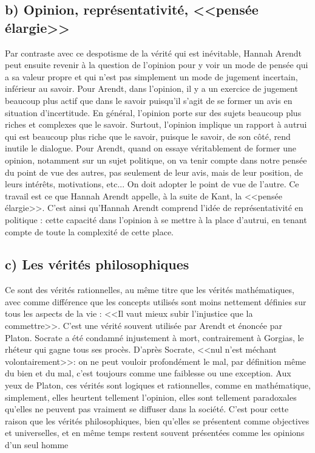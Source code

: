 \documentclass[12pt]{article}
\begin{document}
\subsection*{b) Opinion, représentativité, <<pensée élargie>>}
Par contraste avec ce despotisme de la vérité qui est inévitable, Hannah Arendt peut ensuite revenir à la question de l'opinion pour y voir un mode de pensée qui a sa valeur propre et qui n'est pas simplement un mode de jugement incertain, inférieur au savoir.
Pour Arendt, dans l'opinion, il y a un exercice de jugement beaucoup plus actif que dans le savoir puisqu'il s'agit de se former un avis en situation d'incertitude.
En général, l'opinion porte sur des sujets beaucoup plus riches et complexes que le savoir.
Surtout, l'opinion implique un rapport à autrui qui est beaucoup plus riche que le savoir, puisque le savoir, de son côté, rend inutile le dialogue.
Pour Arendt, quand on essaye véritablement de former une opinion, notamment sur un sujet politique, on va tenir compte dans notre pensée du point de vue des autres, pas seulement de leur avis, mais de leur position, de leurs intérêts, motivations, etc... On doit adopter le point de vue de l'autre.
Ce travail est ce que Hannah Arendt appelle, à la suite de Kant, la <<pensée élargie>>.
C'est ainsi qu'Hannah Arendt comprend l'idée de représentativité en politique : cette capacité dans l'opinion à se mettre à la place d'autrui, en tenant compte de toute la complexité de cette place. 
\pagebreak
\subsection*{c) Les vérités philosophiques}
Ce sont des vérités rationnelles, au même titre que les vérités mathématiques, avec comme différence que les concepts utilisés sont moins nettement définies sur tous les aspects de la vie : <<Il vaut mieux subir l'injustice que la commettre>>.
C'est une vérité souvent utilisée par Arendt et énoncée par Platon. Socrate a été condamné injustement à mort, contrairement à Gorgias, le rhéteur qui gagne tous ses procès. D'après Socrate, <<nul n'est méchant volontairement>>: on ne peut vouloir profondément le mal, par définition même du bien et du mal, c'est toujours comme une faiblesse ou une exception.
Aux yeux de Platon, ces vérités sont logiques et rationnelles, comme en mathématique, simplement, elles heurtent tellement l'opinion, elles sont tellement paradoxales qu'elles ne peuvent pas vraiment se diffuser dans la société. 
C'est pour cette raison que les vérités philosophiques, bien qu'elles se présentent comme objectives et universelles, et en même temps restent souvent présentées comme les opinions d'un seul homme
\end{document}
